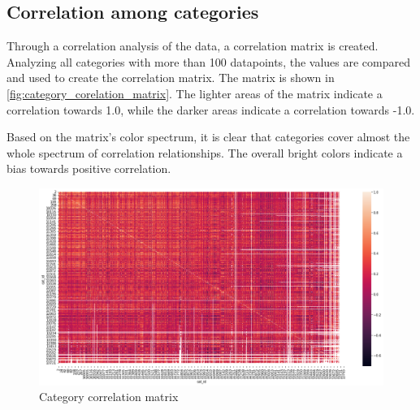 \subsection{Correlation among categories}
Through a correlation analysis of the data, a correlation matrix is created.
Analyzing all categories with more than 100 datapoints, the values are compared and used to create the correlation matrix.
The matrix is shown in \autoref{fig:category_corelation_matrix}.
The lighter areas of the matrix indicate a correlation towards 1.0, while the darker areas indicate a correlation towards -1.0.

Based on the matrix's color spectrum, it is clear that categories cover almost the whole spectrum of correlation relationships.
The overall bright colors indicate a bias towards positive correlation.

\begin{figure}[h!]
  \centering
  \includegraphics[width=\textwidth]{./figs/code_generated/data_exploration/category_correlation_matrix.png}
  \hfill
  \caption{Category correlation matrix}
  \label{fig:category_corelation_matrix}
\end{figure}





